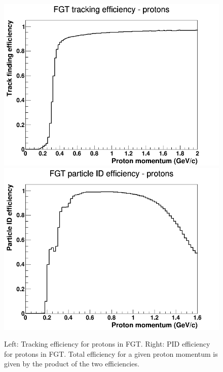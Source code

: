 \documentclass[12pt]{article}
\begin{document}
\begin{figure}[h]
\centering
{}
\includegraphics[width=\linewidth]{eff_plots/fgt_trkeff_proton.png}
\endminipage
{}
\includegraphics[width=\linewidth]{eff_plots/fgt_pideff_proton.png}
\endminipage
\caption{Left: Tracking efficiency for protons in FGT. Right: PID efficiency for protons in FGT. Total efficiency for a given proton momentum is given by the product of the two efficiencies.}
\label{fig:FGT_proton_effs}
\end{figure}
\end{document}
